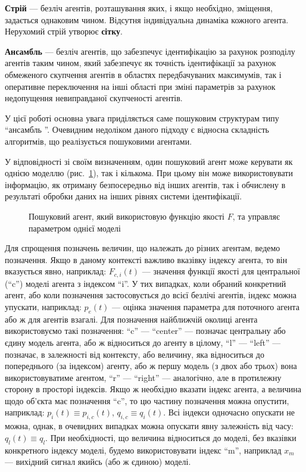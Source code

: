 \documentclass[a4paper,13pt]{atuaref}
\begin{document}
\textbf{Стрій} --- безліч агентів, розташування яких, і якщо необхідно,
зміщення, задається однаковим чином. Відсутня індивідуальна динаміка кожного
агента. Нерухомий стрій утворює \textbf{сітку}.

\textbf {Ансамбль} ---
безліч агентів, що забезпечує ідентифікацію за рахунок розподілу агентів таким
чином, який забезпечує як точність ідентифікації за рахунок обмеженого
скупчення агентів в областях передбачуваних максимумів, так і оперативне
переключення на інші області при зміні параметрів за рахунок недопущення
невиправданої скупченості агентів.

У цієї роботі основна увага приділяється саме пошуковим структурам типу
``ансамбль ''. Очевидним недоліком даного підходу є відносна складність
алгоритмів, що реалізується пошуковими агентами.

У відповідності зі своїм визначенням, один пошуковий агент може керувати як
однією моделлю (рис.~\ref{atu:f:agent1}), так і кількома. При цьому він
може використовувати інформацію, як отриману безпосередньо від інших агентів,
так і обчислену в результаті обробки даних на інших рівнях системи
ідентифікації.

\begin{figure}[htb!]
\begin{center}

\end{center}
\caption{Пошуковий агент, який використовую функцію якості $F$, та управляє параметром однієї моделі}
\label{atu:f:agent1}
\end{figure}

Для спрощення позначень величин, що належать до різних агентам, ведемо
позначення. Якщо в даному контексті важливо вказівку індексу агента, то він
вказується явно, наприклад: $ F_{c, i} (t) $ --- значення функції якості для
центральної (``c'') моделі агента з індексом ``i''. У тих випадках, коли
обраний конкретний агент, або коли позначення застосовується до всієї безлічі
агентів, індекс можна упускати, наприклад: $ p_e (t) $
--- оцінка значення параметра для поточного агента або ж для агентів взагалі.
Для позначення найближчій околиці агента використовуємо такі позначення:
``c'' --- ``center'' --- позначає центральну або єдину модель агента, або ж
відноситься до агенту в цілому, ``l'' --- ``left'' --- позначає, в
залежності від контексту, або величину, яка відноситься до попереднього (за
індексом) агенту, або ж першу модель (з двох або трьох) вона використовуватиме
агентом, ``r'' --- ``right'' --- аналогічно, але в протилежну сторону в
просторі індексів. Якщо ж необхідно вказати індекс агента, а величина щодо
об'єкта має позначення ``c'', то цю частину позначення можна опустити,
наприклад: $ p_i (t) \equiv p_{i, c} (t) $, $ q_{i , c} \equiv q_{i} (t)$.
Всі індекси одночасно опускати не можна, однак, в очевидних випадках можна
опускати явну залежність від часу: $ q_l (t) \equiv q_l $. При необхідності,
що величина відноситься до моделі, без вказівки конкретного індексу моделі,
будемо використовувати індекс ``m'', наприклад $ x_m $ --- вихідний сигнал
якийсь (або ж єдиною) моделі.
\end{document}
